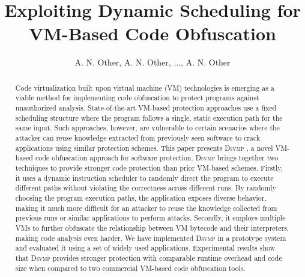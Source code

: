 \documentclass[times]{secauth}
\newcommand{\DSVMP}{\textsc{Dsvmp }}
\begin{document}


\title{Exploiting Dynamic Scheduling for VM-Based Code Obfuscation}%

\author{A. N. Other\footnotemark[2], A. N. Other\footnotemark[2]\corrauth, ..., A. N. Other\footnotemark[3]}

\address{\footnotemark[2]School of Information Science and Technology, Northwest University, Xi'an, 710127, P.R. China.\\
\footnotemark[3]School of Computing and Communications, Lancaster University, UK}


\begin{abstract}
Code virtualization built upon virtual machine (VM) technologies is emerging as a viable method for implementing code obfuscation to protect programs against unauthorized analysis. State-of-the-art VM-based protection approaches use a fixed scheduling structure where the program follows a single, static execution path for the same input. Such approaches, however, are vulnerable to certain scenarios where the attacker can reuse knowledge extracted from previously seen software to crack applications using similar protection schemes. This paper presents \DSVMP, a novel VM-based code obfuscation approach for software protection. \DSVMP brings together two techniques to provide stronger code protection than prior VM-based schemes. Firstly, it uses a dynamic instruction scheduler to randomly direct the program to execute different paths without violating the correctness across different runs. By randomly choosing the program execution paths, the application exposes diverse behavior, making it much more difficult for an attacker to reuse the knowledge collected from previous runs or similar applications to perform attacks. Secondly, it employs multiple VMs to further obfuscate the relationship between VM bytecode and their interpreters, making code analysis even harder. We have implemented \DSVMP in a prototype system and evaluated it using a set of widely used applications. Experimental results show that \DSVMP provides stronger protection with comparable runtime overhead and code size when compared to two commercial VM-based code obfuscation tools.
\end{abstract}
\end{document}
